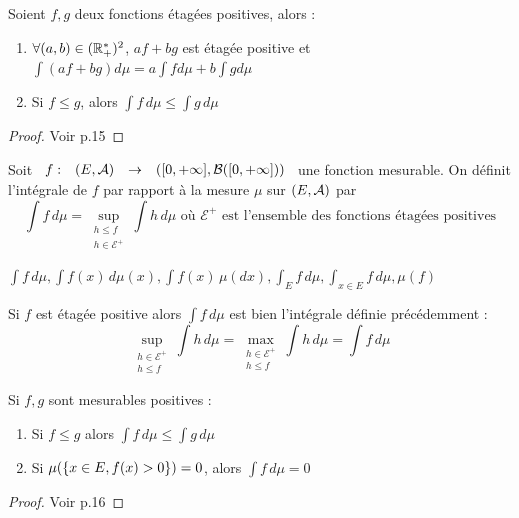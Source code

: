 \documentclass[]{report}
\begin{document}
\begin{prop}
    Soient $f,g$ deux fonctions étagées positives, alors :
    \begin{enumerate}
        \item $\forall(a,b)\in(\mathbb{R}^*_+)^2$, $af+bg$ est étagée positive et $\int(af+bg)d\mu=a\int fd\mu+b\int gd\mu$
        \item Si $f\le g$, alors $\int f\,d\mu\le\int g\,d\mu$
    \end{enumerate}
\end{prop}

\begin{proof}
    Voir p.15
\end{proof}

\begin{df}
    Soit $\begin{array}{ccccc} f : & (E,\mathcal{A}) & \to & ([0,+\infty],\mathcal{B}([0,+\infty])) \end{array}$ une fonction mesurable. On définit l'intégrale de $f$ par rapport à la mesure $\mu$ sur $(E,\mathcal{A})$ par 
    $$\int f\,d\mu=\sup_{\substack{h\le f\\h\in\mathcal{E}^+}}\int h\,d\mu\text{ où }\mathcal{E}^+\text{ est l'ensemble des fonctions étagées positives}$$
\end{df}

\begin{nt}
    $\int f\,d\mu,\int f(x)\,d\mu(x),\int f(x)\,\mu(dx),\int_E f\,d\mu,\int_{x\in E} f\,d\mu,\mu(f)$
\end{nt}

\begin{re}
    Si $f$ est étagée positive alors $\int f\,d\mu$ est bien l'intégrale définie précédemment :$$\sup_{\substack{h\in\mathcal{E^+}\\h\le f}}\int h\,d\mu=\max_{\substack{h\in\mathcal{E^+}\\h\le f}}\int h\,d\mu=\int f\,d\mu$$
\end{re}

\begin{prop}
    Si $f,g$ sont mesurables positives :
    \begin{enumerate}
        \item Si $f\le g$ alors $\int f\,d\mu\le\int g\,d\mu$
        \item Si $\mu(\left\{ x\in E,f(x)>0 \right\})=0$, alors $\int f\,d\mu=0$
    \end{enumerate}
\end{prop}

\begin{proof}
    Voir p.16
\end{proof}
\end{document}
